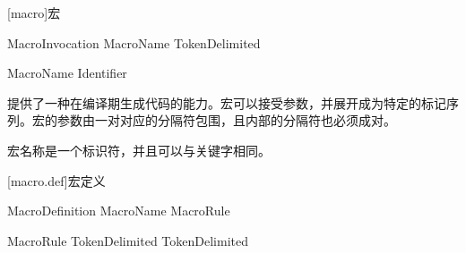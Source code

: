 
[macro]{宏}

\begin{bnf}{MacroInvocation}
    \terminal{\#} MacroName TokenDelimited\bnfq
\end{bnf}

\begin{bnf}{MacroName}
    Identifier
\end{bnf}

\pnum
{}提供了一种在编译期生成代码的能力。宏可以接受参数，并展开成为特定的标记序列。宏的参数由一对对应的分隔符包围，且内部的分隔符也必须成对。

\pnum
宏名称是一个标识符，并且可以与关键字相同。

[macro.def]{宏定义}

\begin{bnf}{MacroDefinition}
     MacroName \terminal{\{} MacroRule\bnfs \terminal{\}}
\end{bnf}

\begin{bnf}{MacroRule}
    TokenDelimited \terminal{->} TokenDelimited
\end{bnf}